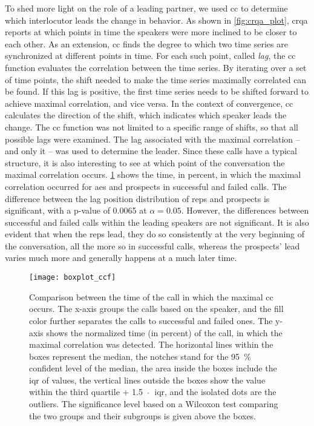 To shed more light on the role of a leading partner, we used \acl{cc} to determine which interlocutor leads the change in behavior.
As shown in \cref{fig:crqa_plot}, \ac{crqa} reports at which points in time the speakers were more inclined to be closer to each other.
As an extension, \acl{cc} finds the degree to which two time series are synchronized at different points in time.
For each such point, called \emph{lag}, the \acl{cc} function evaluates the correlation between the time series.
By iterating over a set of time points, the shift needed to make the time series maximally correlated can be found.
If this lag is positive, the first time series needs to be shifted forward to achieve maximal correlation, and vice versa.
In the context of convergence, \ac{cc} calculates the direction of the shift, which indicates which speaker leads the change.
The \acl{cc} function was not limited to a specific range of shifts, so that all possible lags were examined.
The lag associated with the maximal correlation -- and only it -- was used to determine the leader.
Since these calls have a typical structure, it is also interesting to see at which point of the conversation the maximal correlation occurs.
\cref{fig:barplot_conv_leaders} shows the time, in percent, in which the maximal correlation occurred for \acp{ae} and prospects in successful and failed calls.
The difference between the lag position distribution of reps and prospects is significant, with a p-value of \num{0.0065} at $\alpha = 0.05$.
However, the differences between successful and failed calls within the leading speakers are not significant.
It is also evident that when the reps lead, they do so consistently at the very beginning of the conversation, all the more so in successful calls, whereas the prospects' lead varies much more and generally happens at a much later time.

\begin{figure}[t]
	\centering
	\texttt{[image: boxplot\_ccf]}
	\caption{Comparison between the time of the call in which the maximal \acl{cc} occurs.
		The x-axis groups the calls based on the speaker, and the fill color further separates the calls to successful and failed ones.
		The y-axis shows the normalized time (in percent) of the call, in which the maximal correlation was detected.
		The horizontal lines within the boxes represent the median,
		the notches stand for the \SI{95}{\percent} confident level of the median, the area inside the boxes include the \acf{iqr} of values, the vertical lines outside the boxes show the value within the third quartile + 1.5~$\protect\cdot$~\ac{iqr}, and the isolated dots are the outliers.
		The significance level based on a Wilcoxon test comparing the two groups and their subgroups is given above the boxes.}
	\label{fig:barplot_conv_leaders}
\end{figure}

